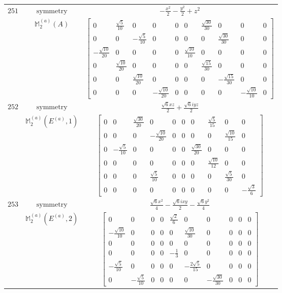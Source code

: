 \documentclass[fleqn,8pt,landscape]{jsarticle}
\begin{document}
\begin{longtable}{ccc}
$ 251 $ & $ \text{symmetry} $ & $ - \frac{x^{2}}{2} - \frac{y^{2}}{2} + z^{2} $ \\
$  $ & $ \mathbb{M}_{2}^{(a)}(A) $ & $ \begin{bmatrix} 0 & \frac{\sqrt{5}}{10} & 0 & 0 & 0 & 0 & \frac{\sqrt{30}}{30} & 0 & 0 & 0 \\ 0 & 0 & - \frac{\sqrt{5}}{10} & 0 & 0 & 0 & 0 & \frac{\sqrt{30}}{30} & 0 & 0 \\ - \frac{\sqrt{10}}{20} & 0 & 0 & 0 & 0 & \frac{\sqrt{10}}{10} & 0 & 0 & 0 & 0 \\ 0 & \frac{\sqrt{10}}{20} & 0 & 0 & 0 & 0 & \frac{\sqrt{15}}{30} & 0 & 0 & 0 \\ 0 & 0 & \frac{\sqrt{10}}{20} & 0 & 0 & 0 & 0 & - \frac{\sqrt{15}}{30} & 0 & 0 \\ 0 & 0 & 0 & - \frac{\sqrt{10}}{20} & 0 & 0 & 0 & 0 & - \frac{\sqrt{10}}{10} & 0 \end{bmatrix} $ \\ \hline
$ 252 $ & $ \text{symmetry} $ & $ \frac{\sqrt{6} x z}{2} + \frac{\sqrt{6} i y z}{2} $ \\
$  $ & $ \mathbb{M}_{2}^{(a)}(E^{(a)},1) $ & $ \begin{bmatrix} 0 & 0 & \frac{\sqrt{30}}{20} & 0 & 0 & 0 & 0 & \frac{\sqrt{5}}{15} & 0 & 0 \\ 0 & 0 & 0 & - \frac{\sqrt{10}}{20} & 0 & 0 & 0 & 0 & \frac{\sqrt{10}}{15} & 0 \\ 0 & - \frac{\sqrt{5}}{10} & 0 & 0 & 0 & 0 & \frac{\sqrt{30}}{20} & 0 & 0 & 0 \\ 0 & 0 & 0 & 0 & 0 & 0 & 0 & \frac{\sqrt{10}}{12} & 0 & 0 \\ 0 & 0 & 0 & \frac{\sqrt{5}}{10} & 0 & 0 & 0 & 0 & \frac{\sqrt{5}}{30} & 0 \\ 0 & 0 & 0 & 0 & 0 & 0 & 0 & 0 & 0 & - \frac{\sqrt{3}}{6} \end{bmatrix} $ \\ \hline
$ 253 $ & $ \text{symmetry} $ & $ \frac{\sqrt{6} x^{2}}{4} - \frac{\sqrt{6} i x y}{2} - \frac{\sqrt{6} y^{2}}{4} $ \\
$  $ & $ \mathbb{M}_{2}^{(a)}(E^{(a)},2) $ & $ \begin{bmatrix} 0 & 0 & 0 & 0 & \frac{\sqrt{2}}{6} & 0 & 0 & 0 & 0 & 0 \\ - \frac{\sqrt{10}}{10} & 0 & 0 & 0 & 0 & \frac{\sqrt{10}}{30} & 0 & 0 & 0 & 0 \\ 0 & 0 & 0 & 0 & 0 & 0 & 0 & 0 & 0 & 0 \\ 0 & 0 & 0 & 0 & - \frac{1}{3} & 0 & 0 & 0 & 0 & 0 \\ - \frac{\sqrt{5}}{10} & 0 & 0 & 0 & 0 & - \frac{2 \sqrt{5}}{15} & 0 & 0 & 0 & 0 \\ 0 & - \frac{\sqrt{5}}{10} & 0 & 0 & 0 & 0 & - \frac{\sqrt{30}}{30} & 0 & 0 & 0 \end{bmatrix} $ \\ \hline

\end{longtable}
\end{document}
